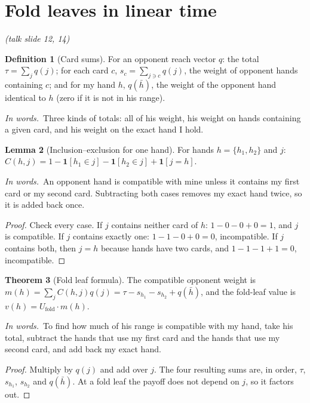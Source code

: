 \documentclass[11pt]{article}
\newcommand{\one}{\mathbf 1}
\theoremstyle{definition}
\newtheorem{definition}{Definition}[section]
\newtheorem{lemma}[definition]{Lemma}
\newtheorem{theorem}[definition]{Theorem}
\newcommand{\inwords}{\par\smallskip\noindent\textit{In words.}\ }
\newcommand{\slide}[1]{\hfill{\small\itshape (talk slide #1)}}
\begin{document}
\section{Fold leaves in linear time}\label{sec:fold}\slide{12, 14}
\begin{definition}[Card sums]\label{def:cardsums}
For an opponent reach vector $q$: the total $\tau=\sum_jq(j)$; for each card $c$, $s_c=\sum_{j\ni c}q(j)$, the weight of opponent
hands containing $c$; and for my hand $h$, $q(\bar h)$, the weight of the opponent hand identical to $h$ (zero if it is not
in his range).
\inwords Three kinds of totals: all of his weight, his weight on hands containing a given card, and his weight on the
exact hand I hold.
\end{definition}

\begin{lemma}[Inclusion--exclusion for one hand]\label{lem:incl}
For hands $h=\{h_1,h_2\}$ and $j$: \quad $C(h,j)=1-\one[h_1\in j]-\one[h_2\in j]+\one[j=h]$.
\inwords An opponent hand is compatible with mine unless it contains my first card or my second card. Subtracting both
cases removes my exact hand twice, so it is added back once.
\end{lemma}
\begin{proof}
Check every case. If $j$ contains neither card of $h$: $1-0-0+0=1$, and $j$ is compatible. If $j$ contains exactly one:
$1-1-0+0=0$, incompatible. If $j$ contains both, then $j=h$ because hands have two cards, and $1-1-1+1=0$, incompatible.
\end{proof}

\begin{theorem}[Fold leaf formula]\label{thm:fold}
The compatible opponent weight is $m(h)=\sum_jC(h,j)q(j)=\tau-s_{h_1}-s_{h_2}+q(\bar h)$, and the fold-leaf value is
$v(h)=U_{\text{fold}}\cdot m(h)$.
\inwords To find how much of his range is compatible with my hand, take his total, subtract the hands that use my first
card and the hands that use my second card, and add back my exact hand.
\end{theorem}
\begin{proof}
Multiply  by $q(j)$ and add over $j$. The four resulting sums are, in order, $\tau$, $s_{h_1}$, $s_{h_2}$ and
$q(\bar h)$. At a fold leaf the payoff does not depend on $j$, so it factors out.
\end{proof}
\end{document}
